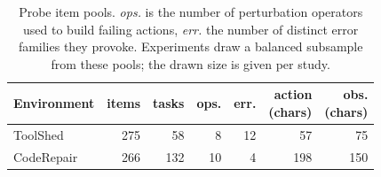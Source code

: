 \begin{table}[t]
\centering
\small
\setlength{\tabcolsep}{3.5pt}
\begin{tabular}{l r r r r r r}
\toprule
Environment & items & tasks & ops. & err. & \makecell{action\\(chars)} & \makecell{obs.\\(chars)} \\
\midrule
ToolShed & 275 & 58 & 8 & 12 & 57 & 75 \\
CodeRepair & 266 & 132 & 10 & 4 & 198 & 150 \\
\bottomrule
\end{tabular}
\caption{Probe item pools. \emph{ops.} is the number of perturbation operators used to build failing actions, \emph{err.} the number of distinct error families they provoke. Experiments draw a balanced subsample from these pools; the drawn size is given per study.}
\label{tab:envs}
\end{table}
